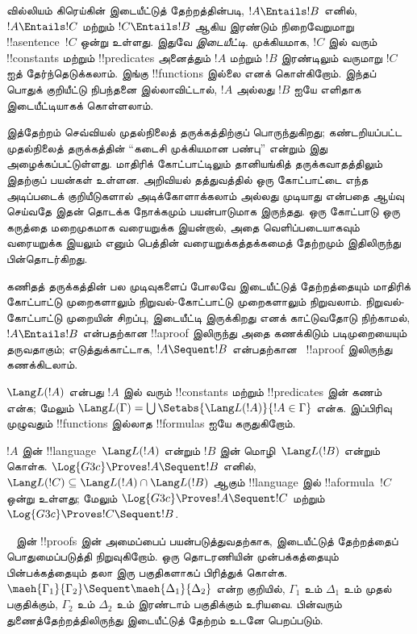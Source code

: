 \documentclass[../../../include/open-logic-section]{subfiles}
\begin{document}


வில்லியம் கிரெய்கின் இடையீட்டுத் தேற்றத்தின்படி, $!A \Entails !B$
எனில், $!A \Entails !C$ மற்றும் $!C \Entails !B$ ஆகிய இரண்டும்
நிறைவேறுமாறு !!a{sentence}~$!C$ ஒன்று உள்ளது. இதுவே
\emph{இடையீட்டி}. முக்கியமாக, $!C$ இல் வரும் !!{constant}s மற்றும்
!!{predicate}s அனைத்தும் $!A$ மற்றும் $!B$ இரண்டிலும் வருமாறு
$!C$ ஐத் தேர்ந்தெடுக்கலாம். இங்கு !!{function}s இல்லை எனக்
கொள்கிறோம். இந்தப் பொதுக் குறியீட்டு நிபந்தனை இல்லாவிட்டால்,
$!A$ அல்லது $!B$ ஐயே எளிதாக இடையீட்டியாகக் கொள்ளலாம்.

இத்தேற்றம் செவ்வியல் முதல்நிலைத் தருக்கத்திற்குப் பொருந்துகிறது;
கண்டறியப்பட்ட முதல்நிலைத் தருக்கத்தின் ``கடைசி முக்கியமான பண்பு''
என்றும் இது அழைக்கப்பட்டுள்ளது. மாதிரிக் கோட்பாட்டிலும் தானியங்கித்
தருக்கவாதத்திலும் இதற்குப் பயன்கள் உள்ளன. அறிவியல் தத்துவத்தில் ஒரு
கோட்பாட்டை எந்த அடிப்படைக் குறியீடுகளால் அடிக்கோளாக்கலாம் அல்லது
முடியாது என்பதை ஆய்வு செய்வதே இதன் தொடக்க நோக்கமும் பயன்பாடுமாக
இருந்தது. ஒரு கோட்பாடு ஒரு கருத்தை மறைமுகமாக வரையறுக்க இயன்றால்,
அதை வெளிப்படையாகவும் வரையறுக்க இயலும் எனும் பெத்தின்
வரையறுக்கத்தக்கமைத் தேற்றமும் இதிலிருந்து பின்தொடர்கிறது.

கணிதத் தருக்கத்தின் பல முடிவுகளைப் போலவே இடையீட்டுத் தேற்றத்தையும்
மாதிரிக் கோட்பாட்டு முறைகளாலும் நிறுவல்-கோட்பாட்டு முறைகளாலும்
நிறுவலாம். நிறுவல்-கோட்பாட்டு முறையின் சிறப்பு, இடையீட்டி இருக்கிறது
எனக் காட்டுவதோடு நிற்காமல், $!A \Entails !B$ என்பதற்கான
!!a{proof} இலிருந்து அதை கணக்கிடும் படிமுறையையும் தருவதாகும்;
எடுத்துக்காட்டாக, $!A \Sequent !B$ என்பதற்கான~
!!a{proof} இலிருந்து கணக்கிடலாம்.

$\Lang L(!A)$ என்பது $!A$ இல் வரும் !!{constant}s மற்றும்
!!{predicate}s இன் கணம் என்க; மேலும்
$\Lang L(\Gamma) = \bigcup \Setabs{\Lang L(!A)}{!A \in
\Gamma}$ என்க. இப்பிரிவு முழுவதும் !!{function}s இல்லாத
!!{formula}s ஐயே கருதுகிறோம்.

\begin{thm}[கிரெய்கின் இடையீட்டுத் தேற்றம்]
$!A$ இன் !!{language}~$\Lang L(!A)$ என்றும் $!B$ இன்
மொழி~$\Lang L(!B)$ என்றும் கொள்க. $\Log{G3c} \Proves
!A \Sequent !B$ எனில், $\Lang L(!C) \subseteq \Lang L(!A)
\cap \Lang L(!B)$ ஆகும் !!{language} இல் !!a{formula}~$!C$
ஒன்று உள்ளது; மேலும் $\Log{G3c} \Proves !A \Sequent !C$
மற்றும் $\Log{G3c} \Proves !C \Sequent !B$.
\end{thm}

~ இன் !!{proof}s இன் அமைப்பைப் பயன்படுத்துவதற்காக,
இடையீட்டுத் தேற்றத்தைப் பொதுமைப்படுத்தி நிறுவுகிறோம். ஒரு தொடரணியின்
முன்பக்கத்தையும் பின்பக்கத்தையும் தலா இரு பகுதிகளாகப் பிரித்துக்
கொள்க. $\maeh{\Gamma_1}{\Gamma_2} \Sequent
\maeh{\Delta_1}{\Delta_2}$ என்ற குறியில், $\Gamma_1$ உம்
$\Delta_1$ உம் முதல் பகுதிக்கும், $\Gamma_2$ உம் $\Delta_2$ உம்
இரண்டாம் பகுதிக்கும் உரியவை. பின்வரும் துணைத்தேற்றத்திலிருந்து
இடையீட்டுத் தேற்றம் உடனே பெறப்படும்.
\end{document}
